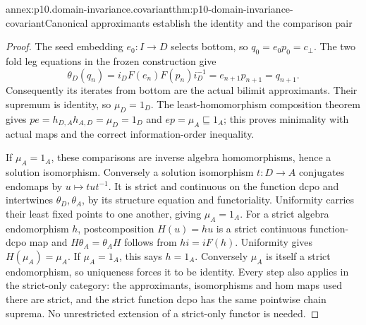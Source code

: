 \begin{annexitem}{annex:p10.domain-invariance.covariant}{thm:p10-domain-invariance-covariant}{Canonical approximants establish the identity and the comparison pair}
\begin{proof}
The seed embedding \(e_0:I\to D\) selects bottom, so
\(q_0=e_0p_0=c_{\bot}\). The two fold leg equations in the
frozen construction give
\[
 \theta_D(q_n)=i_DF(e_n)F(p_n)i_D^{-1}
             =e_{n+1}p_{n+1}=q_{n+1}.
\]
Consequently its iterates from bottom are the actual bilimit
approximants. Their supremum is identity, so \(\mu_D=1_D\).
The least-homomorphism composition theorem gives
\(pe=h_{D,A}h_{A,D}=\mu_D=1_D\) and
\(ep=\mu_A\sqsubseteq1_A\); this proves minimality with
actual maps and the correct information-order inequality.

If \(\mu_A=1_A\), these comparisons are inverse algebra
homomorphisms, hence a solution isomorphism. Conversely a
solution isomorphism \(t:D\to A\) conjugates endomaps by
\(u\mapsto tut^{-1}\). It is strict and continuous on the
function dcpo and intertwines \(\theta_D,\theta_A\), by its
structure equation and functoriality. Uniformity carries their
least fixed points to one another, giving \(\mu_A=1_A\).
For a strict algebra endomorphism \(h\), postcomposition
\(H(u)=hu\) is a strict continuous function-dcpo map and
\(H\theta_A=\theta_AH\) follows from \(hi=iF(h)\).
Uniformity gives \(H(\mu_A)=\mu_A\). If \(\mu_A=1_A\),
this says \(h=1_A\). Conversely \(\mu_A\) is itself a
strict endomorphism, so uniqueness forces it to be identity.
Every step also applies in the strict-only category: the
approximants, isomorphisms and hom maps used there are strict,
and the strict function dcpo has the same pointwise chain suprema.
No unrestricted extension of a strict-only functor is needed.
\end{proof}
\end{annexitem}

